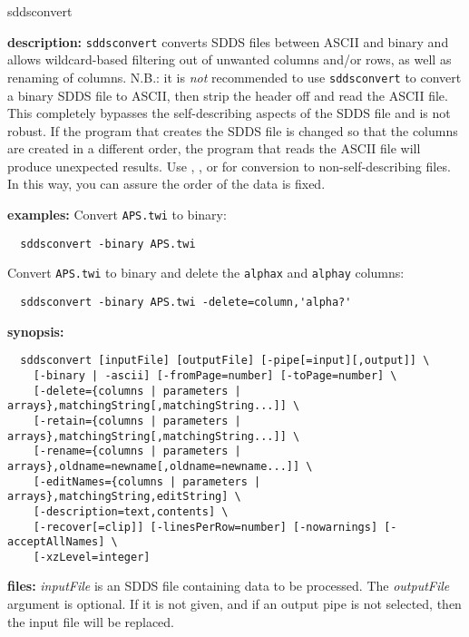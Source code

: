 \begin{sddsprog}{sddsconvert}
  \item \textbf{description:} \verb|sddsconvert| converts SDDS files between ASCII and binary and allows wildcard-based filtering out of unwanted columns and/or rows, as well as renaming of columns. N.B.: it is \emph{not} recommended to use \verb|sddsconvert| to convert a binary SDDS file to ASCII, then strip the header off and read the ASCII file. This completely bypasses the self-describing aspects of the SDDS file and is not robust. If the program that creates the SDDS file is changed so that the columns are created in a different order, the program that reads the ASCII file will produce unexpected results. Use , , or  for conversion to non-self-describing files. In this way, you can assure the order of the data is fixed.

  \item \textbf{examples:}
  Convert \verb|APS.twi| to binary:
  \begin{verbatim}
  sddsconvert -binary APS.twi
  \end{verbatim}
  Convert \verb|APS.twi| to binary and delete the \verb|alphax| and \verb|alphay| columns:
  \begin{verbatim}
  sddsconvert -binary APS.twi -delete=column,'alpha?'
  \end{verbatim}

  \item \textbf{synopsis:}
  \begin{verbatim}
  sddsconvert [inputFile] [outputFile] [-pipe[=input][,output]] \
    [-binary | -ascii] [-fromPage=number] [-toPage=number] \
    [-delete={columns | parameters | arrays},matchingString[,matchingString...]] \
    [-retain={columns | parameters | arrays},matchingString[,matchingString...]] \
    [-rename={columns | parameters | arrays},oldname=newname[,oldname=newname...]] \
    [-editNames={columns | parameters | arrays},matchingString,editString] \
    [-description=text,contents] \
    [-recover[=clip]] [-linesPerRow=number] [-nowarnings] [-acceptAllNames] \
    [-xzLevel=integer]
  \end{verbatim}

  \item \textbf{files:}
  \emph{inputFile} is an SDDS file containing data to be processed. The \emph{outputFile} argument is optional. If it is not given, and if an output pipe is not selected, then the input file will be replaced.


\end{sddsprog}
